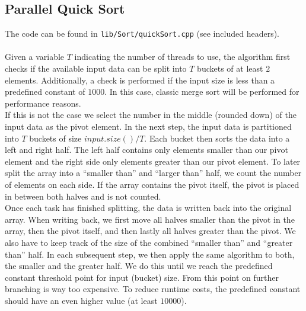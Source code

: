 \documentclass[twocolumn]{article}
\begin{document}
\subsection{Parallel Quick Sort}
The code can be found in \texttt{lib/Sort/quickSort.cpp} (see included headers).\\ 
\\
Given a variable $T$ indicating the number of threads to use, the algorithm first checks if the available input data can be split into $T$ buckets of at least $2$ elements. 
Additionally, a check is performed if the input size is less than a predefined constant of $1000$. 
In this case, classic merge sort will be performed for performance reasons.\\
If this is not the case we select the number in the middle (rounded down) of the input data as the pivot element. 
In the next step, the input data is partitioned into $T$ buckets of size $input.size()/T$. Each bucket then sorts the data into a left and right half. 
The left half contains only elements smaller than our pivot element and the right side only elements greater than our pivot element. 
To later split the array into a ``smaller than'' and ``larger than'' half, we count the number of elements on each side. 
If the array contains the pivot itself, the pivot is placed in between both halves and is not counted.\\
Once each task has finished splitting, the data is written back into the original array. 
When writing back, we first move all halves smaller than the pivot in the array, then the pivot itself, and then lastly all halves greater than the pivot. 
We also have to keep track of the size of the combined ``smaller than'' and ``greater than'' half. 
In each subsequent step, we then apply the same algorithm to both, the smaller and the greater half. 
We do this until we reach the predefined constant threshold point for input (bucket) size. 
From this point on further branching is way too expensive. 
To reduce runtime costs, the predefined constant should have an even higher value (at least $10000$).
\end{document}
